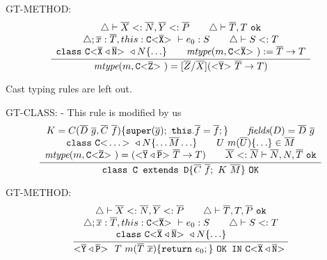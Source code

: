 GT-METHOD:
\begin{align*}
\frac{\displaystyle \begin{array}{c}
\triangle \vdash \overline{X} <: \overline{N}, \overline{Y} <: \overline{P}  \quad \quad 
\triangle \vdash \overline{T}, T \ \texttt{ok} \\
\triangle ; \overline{x}:\overline{T}, this : \mathtt{C {\tt <} \overline{X} {\tt >} \ } \vdash e_0 : S \quad \quad
\triangle \vdash S <: T \\
\texttt{class}\ \mathtt{C {\tt <} \overline{X} \triangleleft \overline{N} {\tt >} \ } \triangleleft N \{ \ldots \} \quad \quad
\textit{mtype}(m, \mathtt{C {\tt <} \overline{X} {\tt >} \ }) := \overline{T} \to T \\
\end{array}}{\displaystyle 
\textit{mtype}(m, \mathtt{C {\tt <} \overline{Z} {\tt >} \ }) = [\overline{Z} / \overline{X}](\mathtt{ {\tt <} \overline{Y} {\tt >} \ } \overline{T} \to T)
}
\end{align*}

Cast typing rules are left out.

GT-CLASS: - This rule is modified by us
\begin{align*}
\frac{\displaystyle 
  \begin{array}{c}
  K = C(\overline{D} \ \overline{g}, \overline{C} \ \overline{f}) \{ \texttt{super}(\overline{g}); \ \texttt{this}.\overline{f}=\overline{f}; \} 
  \quad \quad \textit{fields}(D) = \overline{D} \ \overline{g} \\
  \texttt{class}\ \mathtt{C {\tt <} \ldots {\tt >} \ } \triangleleft N \{ \ldots \overline{M} \ldots \} \quad \quad 
  U\ m(\overline{U}) \{ \ldots \} \in \overline{M} \\
  \textit{mtype}(m, \mathtt{C {\tt <} \overline{Z} {\tt >} \ }) = (\mathtt{ {\tt <} \overline{Y} \triangleleft \overline{P} {\tt >} \ } \overline{T} \to T)
  \quad \quad \overline{X} <: \overline{N} \vdash \overline{N}, N, \overline{T}\ \texttt{ok}
\end{array}
  }{\displaystyle \texttt{class C extends D}\{ \overline{C} \ \overline{f}; \ K \ \overline{M} \} \ \texttt{OK}}
\end{align*}

GT-METHOD:
\begin{align*}
\frac{\displaystyle \begin{array}{c}
\triangle \vdash \overline{X} <: \overline{N}, \overline{Y} <: \overline{P} \quad \quad 
\triangle \vdash \overline{T}, T, \overline{P} \ \texttt{ok} \\
\triangle ; \overline{x}:\overline{T}, this : \mathtt{C {\tt <} \overline{X} {\tt >} \ } \vdash e_0 : S \quad \quad
\triangle \vdash S <: T \\
\texttt{class}\ \mathtt{C {\tt <} \overline{X} \triangleleft \overline{N} {\tt >} \ } \triangleleft N \{ \ldots \} \quad \quad
\end{array}}{\displaystyle \mathtt{ {\tt <} \overline{Y} \triangleleft \overline{P} {\tt >} \ }\ T \ m(\overline{T}\ \overline{x}) \{ \texttt{return} \ e_0; \} \ \texttt{OK IN}\ \mathtt{C {\tt <} \overline{X} \triangleleft \overline{N} {\tt >} \ }}
\end{align*}
